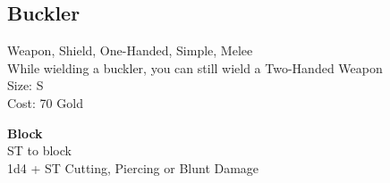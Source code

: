 \subsection{Buckler}\label{weapon:buckler}
Weapon, Shield, One-Handed, Simple, Melee\\
While wielding a buckler, you can still wield a Two-Handed Weapon\\
Size: S\\
Cost: 70 Gold

\textbf{Block}\\
ST to block\\
1d4 + \texttimes ST Cutting, Piercing or Blunt Damage

